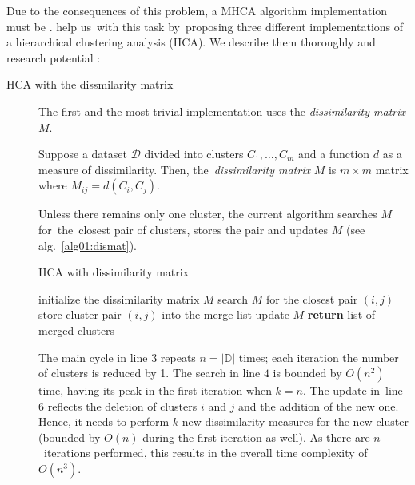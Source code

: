 Due to the consequences of this problem, a MHCA algorithm implementation must be . \citet{day1984efficient} help us\ with this task by~proposing three different implementations of a hierarchical clustering analysis (HCA). We describe them thoroughly and research potential :

\begin{description}
	\item[HCA with the dissmilarity matrix] \xxx{--} The first and the most trivial implementation uses the \emph{dissimilarity matrix} $M$.
	
	\begin{defn}
		Suppose a dataset $\mathcal{D}$ divided into clusters $C_1,\dots,C_m$ and a function $d$ as a measure of dissimilarity. Then, the~\emph{dissimilarity matrix} $M$ is $m\times m$ matrix where $M_{ij} = d(C_i,C_j)$.
		\label{def01:dismat}
	\end{defn}

 Unless there remains only one cluster, the current algorithm searches $M$ for~the~closest pair of clusters, stores the pair and updates $M$ (see alg.~\ref{alg01:dismat}).
	
	\begin{algorithm}[t]
		\caption{HCA with dissimilarity matrix}
		\label{alg01:dismat}
		\begin{algorithmic}[1]
			\State initialize the dissimilarity matrix $M$
			\State search $M$ for the closest pair $(i,j)$ 
			\State store cluster pair $(i,j)$ into the merge list 
			\State update $M$ 
			\EndFor
			\State \textbf{return} list of merged clusters
			\EndProcedure
		\end{algorithmic}
	\end{algorithm}

	The main cycle in line $3$ repeats $n = |\mathbb{D}|$ times; each iteration the number of clusters is reduced by 1. The search in line $4$ is bounded by $O(n^2)$ time, having its peak in the first iteration when $k=n$. The update in~line~$6$ reflects the deletion of clusters $i$ and $j$ and the addition of the new one. Hence, it needs to perform $k$ new dissimilarity measures for the new cluster (bounded by $O(n)$ during the first iteration as well). As there are $n$~iterations performed, this results in the overall time complexity of $O(n^3)$. 
	

\end{description}
